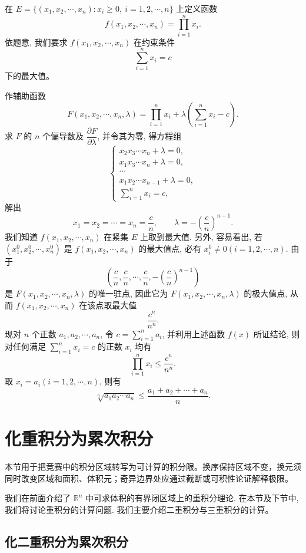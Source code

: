 \documentclass[12pt,fontset=fandol]{ctexart}
\begin{document}
\begin{solve}\quad 在 $E=\{(x_1,x_2,\cdots,x_n):x_i\geqslant0,\ i=1,2,\cdots,n\}$ 上定义函数
\[
  f(x_1,x_2,\cdots,x_n)=\prod_{i=1}^n x_i.
\]
依题意, 我们要求 $f(x_1,x_2,\cdots,x_n)$ 在约束条件
\[
  \sum_{i=1}^n x_i=c
\]
下的最大值。

作辅助函数
\[
  F(x_1,x_2,\cdots,x_n,\lambda)
  =
  \prod_{i=1}^n x_i
  +\lambda\left(\sum_{i=1}^n x_i-c\right).
\]
求 $F$ 的 $n$ 个偏导数及 $\dfrac{\partial F}{\partial\lambda}$, 并令其为零, 得方程组
\[
  \begin{cases}
    x_2x_3\cdots x_n+\lambda=0,\\
    x_1x_3\cdots x_n+\lambda=0,\\
    \cdots\\
    x_1x_2\cdots x_{n-1}+\lambda=0,\\
    \displaystyle\sum_{i=1}^n x_i=c,
  \end{cases}
\]
解出
\[
  x_1=x_2=\cdots=x_n=\frac cn,\qquad
  \lambda=-\left(\frac cn\right)^{n-1}.
\]
我们知道 $f(x_1,x_2,\cdots,x_n)$ 在紧集 $E$ 上取到最大值. 另外, 容易看出, 若 $(x_1^0,x_2^0,\cdots,x_n^0)$ 是 $f(x_1,x_2,\cdots,x_n)$ 的最大值点, 必有 $x_i^0\ne0(i=1,2,\cdots,n)$. 由于
\[
  \left(\frac cn,\frac cn,\cdots,\frac cn,-\left(\frac cn\right)^{n-1}\right)
\]
是 $F(x_1,x_2,\cdots,x_n,\lambda)$ 的唯一驻点, 因此它为 $F(x_1,x_2,\cdots,x_n,\lambda)$ 的极大值点, 从而 $f(x_1,x_2,\cdots,x_n)$ 在该点取最大值
\[
  \frac{c^n}{n^n}.
\]
现对 $n$ 个正数 $a_1,a_2,\cdots,a_n$, 令 $c=\displaystyle\sum_{i=1}^n a_i$, 并利用上述函数 $f(x)$ 所证结论, 则对任何满足 $\displaystyle\sum_{i=1}^n x_i=c$ 的正数 $x_i$ 均有
\[
  \prod_{i=1}^n x_i\leqslant\frac{c^n}{n^n}.
\]
取 $x_i=a_i(i=1,2,\cdots,n)$, 则有
\[
  \sqrt[n]{a_1a_2\cdots a_n}
  \leqslant
  \frac{a_1+a_2+\cdots+a_n}{n}.
\]

\end{solve}


\section{化重积分为累次积分}\label{course-15-3}
本节用于把竞赛中的积分区域转写为可计算的积分限。换序保持区域不变，换元须同时改变区域和面积、体积元；奇异边界处应通过截断或可积性论证解释极限。

我们在前面介绍了 $\mathbb R^n$ 中可求体积的有界闭区域上的重积分理论. 在本节及下节中, 我们将讨论重积分的计算问题. 我们主要介绍二重积分与三重积分的计算。

\subsection{化二重积分为累次积分}
\end{document}
